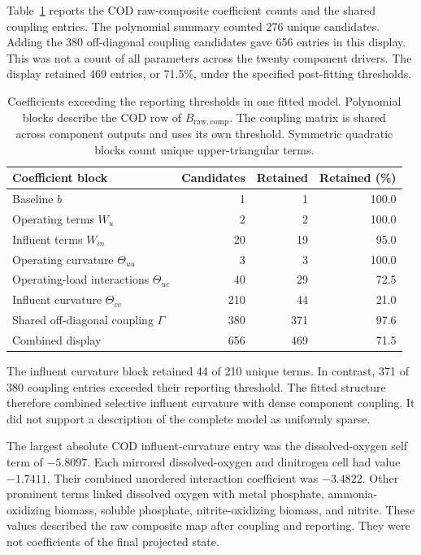 Table~\ref{tab:icsor_coefficient_results} reports the COD raw-composite coefficient counts and the shared coupling entries. The polynomial summary counted 276 unique candidates. Adding the 380 off-diagonal coupling candidates gave 656 entries in this display. This was not a count of all parameters across the twenty component drivers. The display retained 469 entries, or 71.5\%, under the specified post-fitting thresholds.

\begin{table}[htbp]
\centering\small
\caption{Coefficients exceeding the reporting thresholds in one fitted model. Polynomial blocks describe the COD row of $B_{\mathrm{raw,comp}}$. The coupling matrix is shared across component outputs and uses its own threshold. Symmetric quadratic blocks count unique upper-triangular terms.}
\label{tab:icsor_coefficient_results}
\begin{tabular}{p{6.2cm}rrr}
\toprule
Coefficient block & Candidates & Retained & Retained (\%)\\
\midrule
Baseline $b$ & 1 & 1 & 100.0\\
Operating terms $W_u$ & 2 & 2 & 100.0\\
Influent terms $W_{in}$ & 20 & 19 & 95.0\\
Operating curvature $\Theta_{uu}$ & 3 & 3 & 100.0\\
Operating-load interactions $\Theta_{uc}$ & 40 & 29 & 72.5\\
Influent curvature $\Theta_{cc}$ & 210 & 44 & 21.0\\
Shared off-diagonal coupling $\Gamma$ & 380 & 371 & 97.6\\
Combined display & 656 & 469 & 71.5\\
\bottomrule
\end{tabular}
\end{table}

The influent curvature block retained 44 of 210 unique terms. In contrast, 371 of 380 coupling entries exceeded their reporting threshold. The fitted structure therefore combined selective influent curvature with dense component coupling. It did not support a description of the complete model as uniformly sparse.

The largest absolute COD influent-curvature entry was the dissolved-oxygen self term of $-5.8097$. Each mirrored dissolved-oxygen and dinitrogen cell had value $-1.7411$. Their combined unordered interaction coefficient was $-3.4822$. Other prominent terms linked dissolved oxygen with metal phosphate, ammonia-oxidizing biomass, soluble phosphate, nitrite-oxidizing biomass, and nitrite. These values described the raw composite map after coupling and reporting. They were not coefficients of the final projected state.

